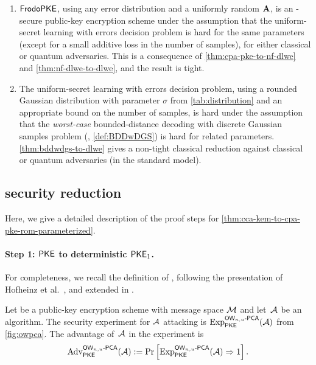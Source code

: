 \begin{enumerate}
\item $\textsf{\upshape\mdseries FrodoPKE}$, using any error distribution and a uniformly random
  $\mathbf{A}$, is an \MINDCPA-secure public-key encryption scheme under the
  assumption that the uniform-secret learning with errors decision
  problem is hard for the same parameters (except for a small additive
  loss in the number of samples), for either classical or quantum
  adversaries.  This is a consequence of
  \autoref{thm:cpa-pke-to-nf-dlwe} and \autoref{thm:nf-dlwe-to-dlwe},
  and the result is tight.

\item The uniform-secret learning with errors decision problem, using
  a rounded Gaussian distribution with parameter $\sigma$ from
  \autoref{tab:distribution} and an appropriate bound on the number of
  samples, is hard under the assumption that the \emph{worst-case}
  bounded-distance decoding with discrete Gaussian samples problem
  (\BDDwDGS, \autoref{def:BDDwDGS}) is hard for related parameters.
  \autoref{thm:bddwdgs-to-dlwe} gives a non-tight classical reduction
  against classical or quantum adversaries (in the standard model).
\end{enumerate}

\subsection{\MINDCCA security reduction}%
\label{sec:rom-mindcca}


Here, we give a detailed description of the proof steps for \autoref{thm:cca-kem-to-cpa-pke-rom-parameterized}.

\paragraph{Step 1: \MINDCPA $\textsf{\upshape\mdseries PKE}$ to \MOWPCA deterministic $\textsf{\upshape\mdseries PKE}_1$.}

For completeness, we recall the definition of \MOWPCA, following the
presentation of Hofheinz et al.~\cite{TCC:HofHovKil17}, and extended in \cite{GlabushThesis}.

\begin{definition}%
  \label{def:OW-CPA}
  Let \PKE be a public-key encryption scheme with message space
  $\mathcal{M}$ and let~$\mathcal{A}$ be an algorithm.  The \MOWPCA security
  experiment for $\mathcal{A}$ attacking \PKE is
  $\mathrm{Exp}^{\textsf{\upshape\mdseries \ensuremath{\textsf{\upshape\mdseries OW}_{n,u}\text{-}\textsf{\upshape\mdseries PCA}}}}_{\textsf{\upshape\mdseries PKE}}(\mathcal{A})$ from \autoref{fig:owpca}.  The
  advantage of~$\mathcal{A}$ in the experiment is
  \[ \mathrm{Adv}^{\textsf{\upshape\mdseries \ensuremath{\textsf{\upshape\mdseries OW}_{n,u}\text{-}\textsf{\upshape\mdseries PCA}}}}_{\textsf{\upshape\mdseries PKE}}(\mathcal{A}) :=  \Pr\left[ \mathrm{Exp}^{\textsf{\upshape\mdseries \ensuremath{\textsf{\upshape\mdseries OW}_{n,u}\text{-}\textsf{\upshape\mdseries PCA}}}}_{\textsf{\upshape\mdseries PKE}}(\mathcal{A}) \Rightarrow 1 \right]  . \]
\end{definition}

